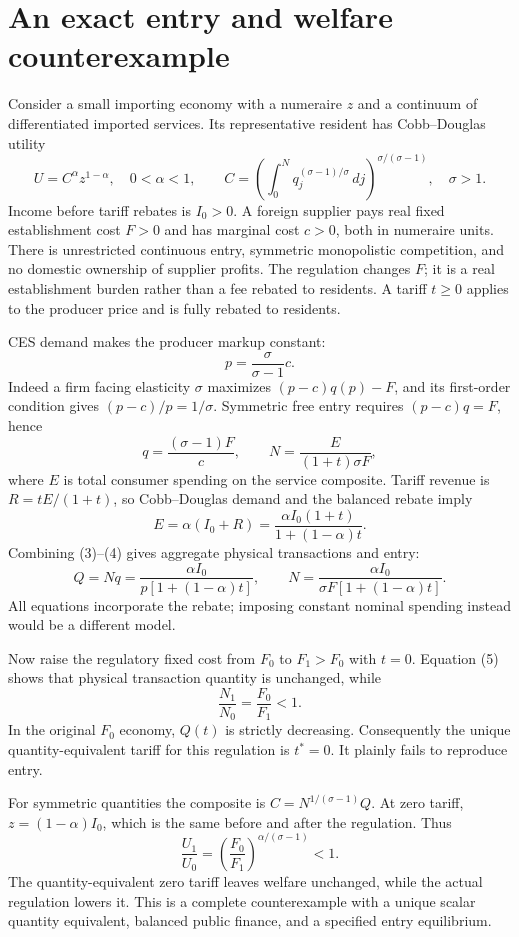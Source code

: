 \documentclass[11pt]{article}
\begin{document}
\section*{An exact entry and welfare counterexample}
Consider a small importing economy with a numeraire $z$ and a continuum of differentiated imported services. Its representative resident has Cobb--Douglas utility
\[
 U=C^\alpha z^{1-\alpha},\quad 0<\alpha<1,\qquad
 C=\left(\int_0^N q_j^{(\sigma-1)/\sigma}\,dj\right)^{\sigma/(\sigma-1)},
 \quad \sigma>1.
\]
Income before tariff rebates is $I_0>0$. A foreign supplier pays real fixed establishment cost $F>0$ and has marginal cost $c>0$, both in numeraire units. There is unrestricted continuous entry, symmetric monopolistic competition, and no domestic ownership of supplier profits. The regulation changes $F$; it is a real establishment burden rather than a fee rebated to residents. A tariff $t\geq0$ applies to the producer price and is fully rebated to residents.

CES demand makes the producer markup constant:
\[
 p=\frac{\sigma}{\sigma-1}c.
\]
Indeed a firm facing elasticity $\sigma$ maximizes $(p-c)q(p)-F$, and its first-order condition gives $(p-c)/p=1/\sigma$. Symmetric free entry requires $(p-c)q=F$, hence
\[
 q=\frac{(\sigma-1)F}{c},\qquad
 N=\frac{E}{(1+t)\sigma F},                                  \tag{3}
\]
where $E$ is total consumer spending on the service composite. Tariff revenue is $R=tE/(1+t)$, so Cobb--Douglas demand and the balanced rebate imply
\[
 E=\alpha(I_0+R)
   =\frac{\alpha I_0(1+t)}{1+(1-\alpha)t}.                    \tag{4}
\]
Combining (3)--(4) gives aggregate physical transactions and entry:
\[
 Q=Nq=\frac{\alpha I_0}{p[1+(1-\alpha)t]},\qquad
 N=\frac{\alpha I_0}{\sigma F[1+(1-\alpha)t]}.                \tag{5}
\]
All equations incorporate the rebate; imposing constant nominal spending instead would be a different model.

Now raise the regulatory fixed cost from $F_0$ to $F_1>F_0$ with $t=0$. Equation (5) shows that physical transaction quantity is unchanged, while
\[
 \frac{N_1}{N_0}=\frac{F_0}{F_1}<1.
\]
In the original $F_0$ economy, $Q(t)$ is strictly decreasing. Consequently the unique quantity-equivalent tariff for this regulation is $t^*=0$. It plainly fails to reproduce entry.

For symmetric quantities the composite is $C=N^{1/(\sigma-1)}Q$. At zero tariff, $z=(1-\alpha)I_0$, which is the same before and after the regulation. Thus
\[
 \frac{U_1}{U_0}=\left(\frac{F_0}{F_1}\right)^{\alpha/(\sigma-1)}<1. \tag{6}
\]
The quantity-equivalent zero tariff leaves welfare unchanged, while the actual regulation lowers it. This is a complete counterexample with a unique scalar quantity equivalent, balanced public finance, and a specified entry equilibrium.
\end{document}
